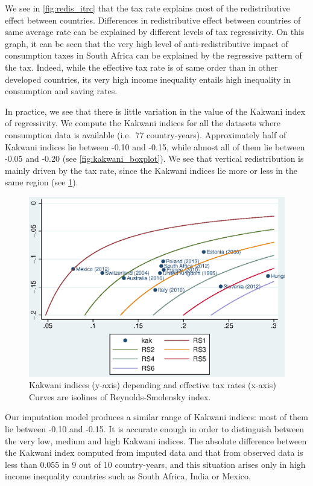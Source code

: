 \documentclass[12pt]{article}
\begin{document}
We see in \cref{fig:redis_itrc} that the tax rate explains most of the redistributive effect between countries. Differences in redistributive effect between countries of same average rate can be explained by different levels of tax regressivity. On this graph, it can be seen that the very high level of anti-redistributive impact of consumption taxes in South Africa can be explained by the regressive pattern of the tax. Indeed, while the effective tax rate is of same order than in other developed countries, its very high income inequality entails high inequality in consumption and saving rates.

In practice, we see that there is little variation in the value of the Kakwani index of regressivity. We compute the Kakwani indices for all the datasets where consumption data is available (i.e.\ 77 country-years). Approximately half of Kakwani indices lie between -0.10 and -0.15, while almost all of them lie between -0.05 and -0.20 (see \cref{fig:kakwani_boxplot}). We see that vertical redistribution is mainly driven by the tax rate, since the Kakwani indices lie more or less in the same region (see \cref{fig:RS_isolines}).

\begin{figure}[h]
    \centering
    \includegraphics{"images/19-01-11 RS isolines obs mod1"}
    \caption{Kakwani indices (y-axis) depending and effective tax rates (x-axis) \\ 
    Curves are isolines of Reynolds-Smolensky index.}
    \label{fig:RS_isolines}
\end{figure}

Our imputation model produces a similar range of Kakwani indices: most of them lie between -0.10 and -0.15. It is accurate enough in order to distinguish between the very low, medium and high Kakwani indices. The absolute difference between the Kakwani index computed from imputed data and that from observed data is less than 0.055 in 9 out of 10 country-years, and this situation arises only in high income inequality countries such as South Africa, India or Mexico.
\end{document}
